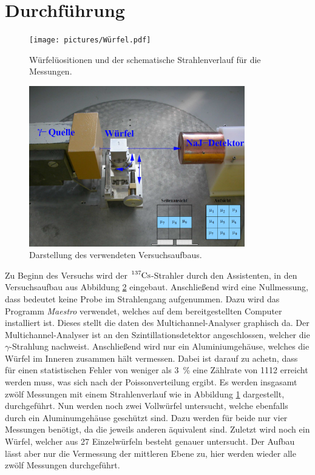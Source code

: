 \newpage
\section{Durchführung}
\label{sec:Durchführung}

\begin{figure}[htb]
  \centering
  \texttt{[image: pictures/Würfel.pdf]}
  \caption{Würfelüositionen und der schematische Strahlenverlauf für die Messungen.}
  \label{fig:wuerfel}
\end{figure}

\begin{figure}[htb]
  \centering
  \includegraphics[height=7.0cm]{content/pictures/Aufbau.png}
  \caption{Darstellung des verwendeten Versuchsaufbaus.\cite{anleitung}}
  \label{fig:Aufbau}
\end{figure}
Zu Beginn des Versuchs wird der $\ce{^137Cs}$-Strahler durch den Assistenten, in den Versuchsaufbau aus Abbildung \ref{fig:Aufbau} eingebaut. 
Anschließend wird eine Nullmessung, dass bedeutet keine Probe im Strahlengang
aufgenummen. Dazu wird das Programm \textit{Maestro} verwendet, welches auf dem bereitgestellten Computer installiert ist. Dieses stellt die daten des 
Multichannel-Analyser graphisch da. Der Multichannel-Analyser ist an den Szintillationsdetektor angeschlossen, welcher die $\gamma$-Strahlung nachweist.
Anschließend wird nur ein Aluminiumgehäuse, welches die Würfel im Inneren zusammen hält vermessen. Dabei ist darauf zu achetn, dass für einen statistischen Fehler
von weniger als \SI{3}{\percent} eine Zählrate von \num{1112} erreicht werden muss, was sich nach der Poissonverteilung ergibt. Es werden insgasamt
zwölf Messungen mit einem Strahlenverlauf wie in Abbildung \ref{fig:wuerfel} dargestellt, durchgeführt.
Nun werden noch zwei Vollwürfel untersucht, welche ebenfalls durch ein Aluminumgehäuse geschützt sind. Dazu werden für beide nur vier Messungen benötigt,
da die jeweils anderen äquivalent sind.
Zuletzt wird noch ein Würfel, welcher aus \num{27} Einzelwürfeln besteht genauer untersucht. Der Aufbau lässt aber nur die Vermessung der mittleren Ebene zu, hier werden 
wieder alle zwölf Messungen durchgeführt.
\FloatBarrier